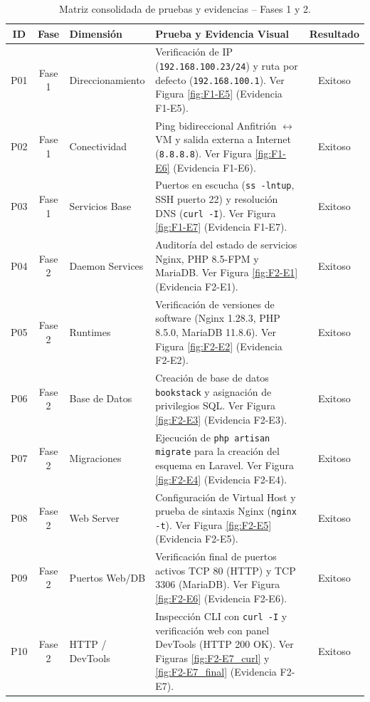 \documentclass[12pt,a4paper]{article}
\begin{document}
\begin{table}[h!]
\centering
\small
\begin{tabular}{|c|c|p{3.2cm}|p{6.2cm}|c|}
\hline
\textbf{ID} & \textbf{Fase} & \textbf{Dimensión} & \textbf{Prueba y Evidencia Visual} & \textbf{Resultado} \\ \hline
P01 & Fase 1 & Direccionamiento & Verificación de IP (\texttt{192.168.100.23/24}) y ruta por defecto (\texttt{192.168.100.1}). Ver Figura \ref{fig:F1-E5} (Evidencia F1-E5). & Exitoso \\ \hline
P02 & Fase 1 & Conectividad & Ping bidireccional Anfitrión $\leftrightarrow$ VM y salida externa a Internet (\texttt{8.8.8.8}). Ver Figura \ref{fig:F1-E6} (Evidencia F1-E6). & Exitoso \\ \hline
P03 & Fase 1 & Servicios Base & Puertos en escucha (\texttt{ss -lntup}, SSH puerto 22) y resolución DNS (\texttt{curl -I}). Ver Figura \ref{fig:F1-E7} (Evidencia F1-E7). & Exitoso \\ \hline
P04 & Fase 2 & Daemon Services & Auditoría del estado de servicios Nginx, PHP 8.5-FPM y MariaDB. Ver Figura \ref{fig:F2-E1} (Evidencia F2-E1). & Exitoso \\ \hline
P05 & Fase 2 & Runtimes & Verificación de versiones de software (Nginx 1.28.3, PHP 8.5.0, MariaDB 11.8.6). Ver Figura \ref{fig:F2-E2} (Evidencia F2-E2). & Exitoso \\ \hline
P06 & Fase 2 & Base de Datos & Creación de base de datos \texttt{bookstack} y asignación de privilegios SQL. Ver Figura \ref{fig:F2-E3} (Evidencia F2-E3). & Exitoso \\ \hline
P07 & Fase 2 & Migraciones & Ejecución de \texttt{php artisan migrate} para la creación del esquema en Laravel. Ver Figura \ref{fig:F2-E4} (Evidencia F2-E4). & Exitoso \\ \hline
P08 & Fase 2 & Web Server & Configuración de Virtual Host y prueba de sintaxis Nginx (\texttt{nginx -t}). Ver Figura \ref{fig:F2-E5} (Evidencia F2-E5). & Exitoso \\ \hline
P09 & Fase 2 & Puertos Web/DB & Verificación final de puertos activos TCP 80 (HTTP) y TCP 3306 (MariaDB). Ver Figura \ref{fig:F2-E6} (Evidencia F2-E6). & Exitoso \\ \hline
P10 & Fase 2 & HTTP / DevTools & Inspección CLI con \texttt{curl -I} y verificación web con panel DevTools (HTTP 200 OK). Ver Figuras \ref{fig:F2-E7_curl} y \ref{fig:F2-E7_final} (Evidencia F2-E7). & Exitoso \\ \hline
\end{tabular}
\caption{Matriz consolidada de pruebas y evidencias -- Fases 1 y 2.}
\label{tab:matriz_pruebas}
\end{table}
\end{document}
